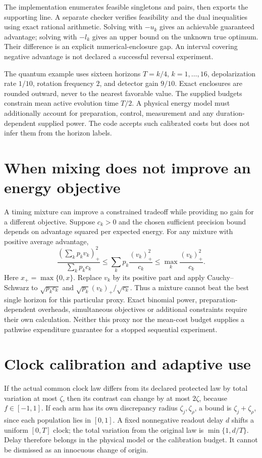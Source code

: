 The implementation enumerates feasible singletons and pairs, then exports
the supporting line. A separate checker verifies feasibility and the dual
inequalities using exact rational arithmetic. Solving with $-u_k$ gives an
achievable guaranteed advantage; solving with $-l_k$ gives an upper bound on
the unknown true optimum. Their difference is an explicit numerical-enclosure
gap. An interval covering negative advantage is not declared a successful
reversal experiment.

The quantum example uses sixteen horizons $T=k/4$, $k=1,\ldots,16$,
depolarization rate $1/10$, rotation frequency $2$, and detector gain $9/10$.
Exact enclosures are rounded outward, never to the nearest favorable value.
The supplied budgets constrain mean active evolution time $T/2$. A physical
energy model must additionally account for preparation, control, measurement
and any duration-dependent supplied power. The code accepts such calibrated
costs but does not infer them from the horizon labels.

\section{When mixing does not improve an energy objective}
A timing mixture can improve a constrained tradeoff while providing no gain
for a different objective. Suppose $c_k>0$ and the chosen sufficient precision
bound depends on advantage squared per expected energy. For any mixture with
positive average advantage,
\[
 \frac{(\sum_kp_kv_k)_+^2}{\sum_kp_kc_k}
 \leq\sum_kp_k\frac{(v_k)_+^2}{c_k}
 \leq\max_k\frac{(v_k)_+^2}{c_k}.
\]
Here $x_+=\max\{0,x\}$. Replace $v_k$ by its positive part and apply
Cauchy--Schwarz to $\sqrt{p_kc_k}$ and
$\sqrt{p_k}(v_k)_+/\sqrt{c_k}$. Thus a mixture cannot beat the best single
horizon for this particular proxy. Exact binomial power, preparation-dependent
overheads, simultaneous objectives or additional constraints require their
own calculation. Neither this proxy nor the mean-cost budget supplies a
pathwise expenditure guarantee for a stopped sequential experiment.

\section{Clock calibration and adaptive use}
If the actual common clock law differs from its declared protected law by
total variation at most $\zeta$, then its contrast can change by at most
$2\zeta$, because $f\in[-1,1]$. If each arm has its own discrepancy radius
$\zeta_j,\zeta_\rho$, a bound is $\zeta_j+\zeta_\rho$, since each
population lies in $[0,1]$. A fixed nonnegative readout delay $d$ shifts a
uniform $[0,T]$ clock; the total variation from the original law is
$\min\{1,d/T\}$. Delay therefore belongs in the physical model or the
calibration budget. It cannot be dismissed as an innocuous change of origin.

